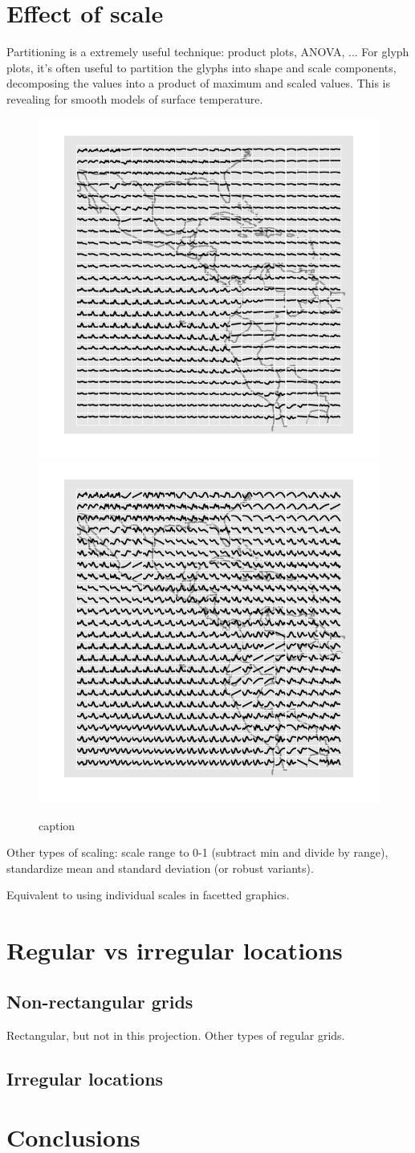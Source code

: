 \documentclass[oneside]{article}
\begin{document}
\section{Effect of scale}

Partitioning is a extremely useful technique: product plots, ANOVA, ...  For glyph plots, it's often useful to partition the glyphs into shape and scale components, decomposing the values into a product of maximum and scaled values. This is revealing for smooth models of surface temperature.

\begin{figure}[htbp]
  \centering
  \includegraphics[width=0.5\linewidth]{month-rescale-max}%
  \includegraphics[width=0.5\linewidth]{month-rescale01}
  \caption{caption}
  \label{fig:label}
\end{figure}

Other types of scaling: scale range to 0-1 (subtract min and divide by range), standardize mean and standard deviation (or robust variants). 

Equivalent to using individual scales in facetted graphics.


\section{Regular vs irregular locations}

\subsection{Non-rectangular grids}

Rectangular, but not in this projection.  Other types of regular grids.

\subsection{Irregular locations}

\section{Conclusions}


\end{document}
